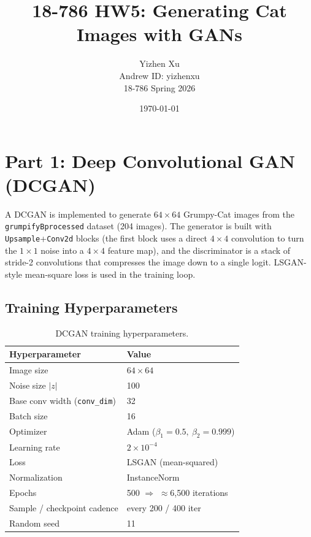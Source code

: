 \documentclass[11pt]{article}
\title{\textbf{18-786 HW5: Generating Cat Images with GANs}}
\author{Yizhen Xu \\ Andrew ID: yizhenxu \\ 18-786 Spring 2026}
\date{\today}
\begin{document}
\maketitle

\section{Part 1: Deep Convolutional GAN (DCGAN)}

A DCGAN is implemented to generate $64\times 64$ Grumpy-Cat images from the
\texttt{grumpifyBprocessed} dataset (204 images). The generator is built with
\texttt{Upsample}+\texttt{Conv2d} blocks (the first block uses a direct
$4\times 4$ convolution to turn the $1\times 1$ noise into a $4\times 4$ feature
map), and the discriminator is a stack of stride-2 convolutions that compresses
the image down to a single logit. LSGAN-style mean-square loss is used in the
training loop.

\subsection{Training Hyperparameters}
\begin{table}[H]
\centering
\begin{tabular}{ll}
\toprule
Hyperparameter & Value \\
\midrule
Image size & $64\times 64$ \\
Noise size $|z|$ & 100 \\
Base conv width (\texttt{conv\_dim}) & 32 \\
Batch size & 16 \\
Optimizer & Adam ($\beta_1=0.5,\ \beta_2=0.999$) \\
Learning rate & $2\times 10^{-4}$ \\
Loss & LSGAN (mean-squared) \\
Normalization & InstanceNorm \\
Epochs & 500 $\Rightarrow$ $\approx$6{,}500 iterations \\
Sample / checkpoint cadence & every 200 / 400 iter \\
Random seed & 11 \\
\bottomrule
\end{tabular}
\caption{DCGAN training hyperparameters.}
\end{table}
\end{document}
